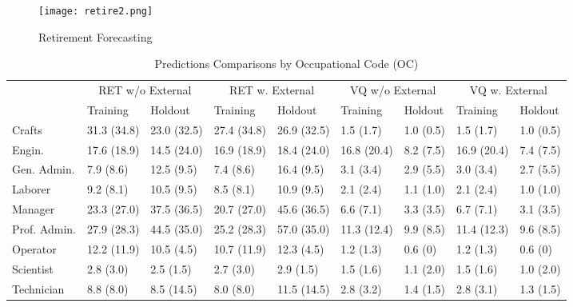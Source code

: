 \documentclass[12pt,letterpaper]{article}
\begin{document}
\begin{figure}[h!]
	\centering
	\texttt{[image: retire2.png]}
	\caption{Retirement Forecasting}
	\label{fig:predict}	
	
\end{figure}
\begin{table}[h!]
	\centering
	\scriptsize
	\smallskip
	\caption{Predictions Comparisons by Occupational Code (OC)}
	\begin{threeparttable}
		    \begin{tabular}{lllllllll}
		    	\toprule
		    	& \multicolumn{2}{c}{RET w/o External} & \multicolumn{2}{c}{RET w. External} & \multicolumn{2}{c}{VQ w/o External} & \multicolumn{2}{c}{VQ w. External} \\  \cline{2-9}
		    	  	& Training & Holdout & Training & Holdout & Training & Holdout & Training & Holdout \\ \midrule
		    	Crafts  & 31.3\tnote{1} (34.8)\tnote{2} & 23.0 (32.5) & 27.4 (34.8) & 26.9 (32.5) & 1.5 (1.7) & 1.0 (0.5) & 1.5 (1.7) & 1.0 (0.5) \\
		    	Engin.    & 17.6 (18.9) & 14.5 (24.0) & 16.9 (18.9) & 18.4 (24.0) & 16.8 (20.4) & 8.2 (7.5) & 16.9 (20.4) & 7.4 (7.5) \\
		    	Gen. Admin. & 7.9 (8.6) & 12.5 (9.5) & 7.4 (8.6) & 16.4 (9.5) & 3.1 (3.4) & 2.9 (5.5) & 3.0 (3.4) & 2.7 (5.5) \\
		    	Laborer     & 9.2 (8.1) & 10.5 (9.5) & 8.5 (8.1) & 10.9 (9.5) & 2.1 (2.4) & 1.1 (1.0) & 2.1 (2.4) & 1.0 (1.0) \\
		    	Manager     & 23.3 (27.0) & 37.5 (36.5) & 20.7 (27.0) & 45.6 (36.5) & 6.6 (7.1) & 3.3 (3.5) & 6.7 (7.1) & 3.1 (3.5) \\
		    	Prof. Admin.     & 27.9 (28.3) & 44.5 (35.0) & 25.2 (28.3) & 57.0 (35.0) & 11.3 (12.4) & 9.9 (8.5) & 11.4 (12.3) & 9.6 (8.5) \\
		    	Operator     & 12.2 (11.9) & 10.5 (4.5) & 10.7 (11.9) & 12.3 (4.5) & 1.2 (1.3) & 0.6 (0) & 1.2 (1.3) & 0.6 (0) \\
		    	Scientist     & 2.8 (3.0) & 2.5 (1.5) & 2.7 (3.0) & 2.9 (1.5) & 1.5 (1.6) & 1.1 (2.0) & 1.5 (1.6) & 1.0 (2.0) \\
		    	Technician     & 8.8 (8.0) & 8.5 (14.5) & 8.0 (8.0) & 11.5 (14.5) & 2.8 (3.2) & 1.4 (1.5) & 2.8 (3.1) & 1.3 (1.5) \\
		    	\bottomrule
		    \end{tabular}%
		

\end{threeparttable}
\end{table}
\end{document}
